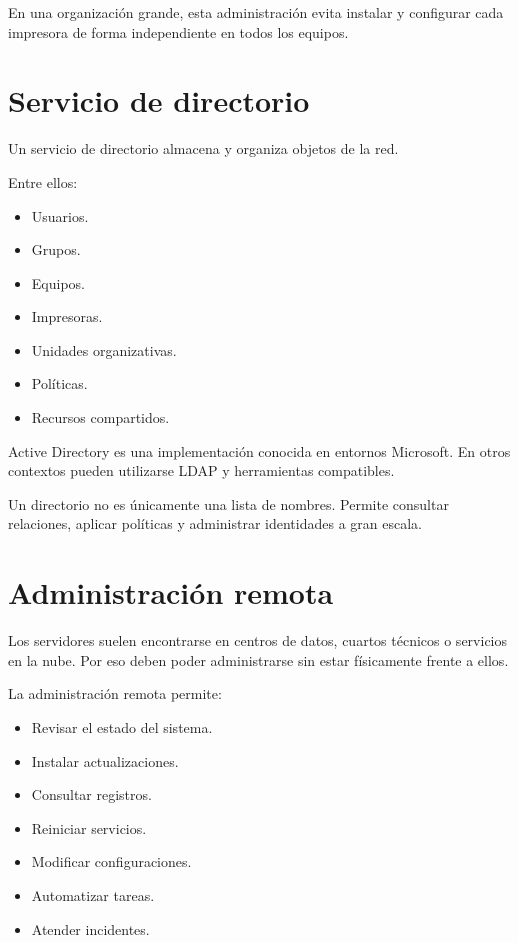 \documentclass[
  spanish,
  letterpaper,
]{scrbook}
\providecommand{\tightlist}{%
  \setlength{\itemsep}{0pt}\setlength{\parskip}{0pt}}
\begin{document}
En una organización grande, esta administración evita instalar y
configurar cada impresora de forma independiente en todos los equipos.


\chapter{Servicio de directorio}\label{servicio-de-directorio}

Un servicio de directorio almacena y organiza objetos de la red.

Entre ellos:

\begin{itemize}
\tightlist
\item
  Usuarios.
\item
  Grupos.
\item
  Equipos.
\item
  Impresoras.
\item
  Unidades organizativas.
\item
  Políticas.
\item
  Recursos compartidos.
\end{itemize}

Active Directory es una implementación conocida en entornos Microsoft.
En otros contextos pueden utilizarse LDAP y herramientas compatibles.

Un directorio no es únicamente una lista de nombres. Permite consultar
relaciones, aplicar políticas y administrar identidades a gran escala.


\chapter{Administración remota}\label{administraciuxf3n-remota}

Los servidores suelen encontrarse en centros de datos, cuartos técnicos
o servicios en la nube. Por eso deben poder administrarse sin estar
físicamente frente a ellos.

La administración remota permite:

\begin{itemize}
\tightlist
\item
  Revisar el estado del sistema.
\item
  Instalar actualizaciones.
\item
  Consultar registros.
\item
  Reiniciar servicios.
\item
  Modificar configuraciones.
\item
  Automatizar tareas.
\item
  Atender incidentes.
\end{itemize}
\end{document}
